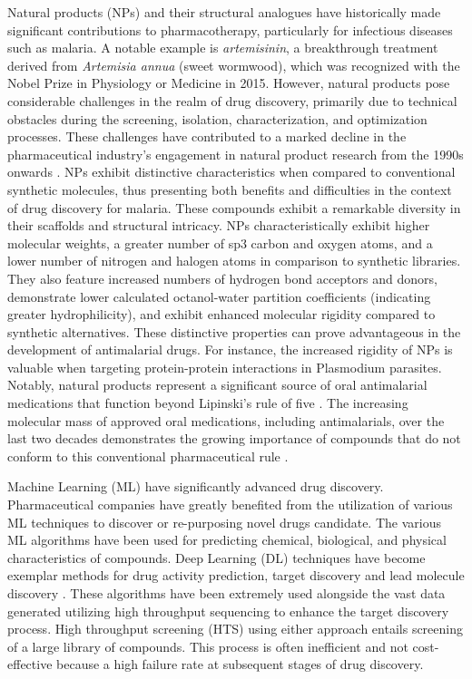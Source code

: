 Natural products (NPs) and their structural analogues have historically made significant contributions to pharmacotherapy, particularly for infectious diseases such as malaria. A notable example is  \emph{artemisinin}, a breakthrough treatment derived from \emph{Artemisia annua} (sweet wormwood), which was recognized with the Nobel Prize in Physiology or Medicine in 2015. However, natural products pose considerable challenges in the realm of drug discovery, primarily due to technical obstacles during the screening, isolation, characterization, and optimization processes. These challenges have contributed to a marked decline in the pharmaceutical industry's engagement in natural product research from the 1990s onwards \cite{Atanasov2021}. NPs exhibit distinctive characteristics when compared to conventional synthetic molecules, thus presenting both benefits and difficulties in the context of drug discovery for malaria. These compounds exhibit a remarkable diversity in their scaffolds and structural intricacy. NPs characteristically exhibit higher molecular weights, a greater number of sp3 carbon and oxygen atoms, and a lower number of nitrogen and halogen atoms in comparison to synthetic libraries. They also feature increased numbers of hydrogen bond acceptors and donors, demonstrate lower calculated octanol-water partition coefficients (indicating greater hydrophilicity), and exhibit enhanced molecular rigidity compared to synthetic alternatives. These distinctive properties can prove advantageous in the development of antimalarial drugs. For instance, the increased rigidity of NPs is valuable when targeting protein-protein interactions in Plasmodium parasites. Notably, natural products represent a significant source of oral antimalarial medications that function beyond Lipinski's rule of five \cite{Lipinski2004,Lipinski1997,Lipinski2004a}. The increasing molecular mass of approved oral medications, including antimalarials, over the last two decades demonstrates the growing importance of compounds that do not conform to this conventional pharmaceutical rule \cite{Shultz2018}.

Machine Learning (ML) have significantly advanced drug discovery. Pharmaceutical companies have greatly benefited from the utilization of various ML techniques to discover or re-purposing novel drugs candidate. The various ML algorithms have been used for predicting chemical, biological, and physical characteristics of compounds. Deep Learning (DL) techniques have become exemplar methods for drug activity prediction, target discovery and lead molecule discovery \cite{Patel2020}. These algorithms have been extremely used alongside the vast data generated utilizing high throughput sequencing to enhance the target discovery process. High throughput screening (HTS) using either approach entails screening of a large library of compounds. This process is often inefficient and not cost-effective because a high failure rate at subsequent stages of drug discovery. 

